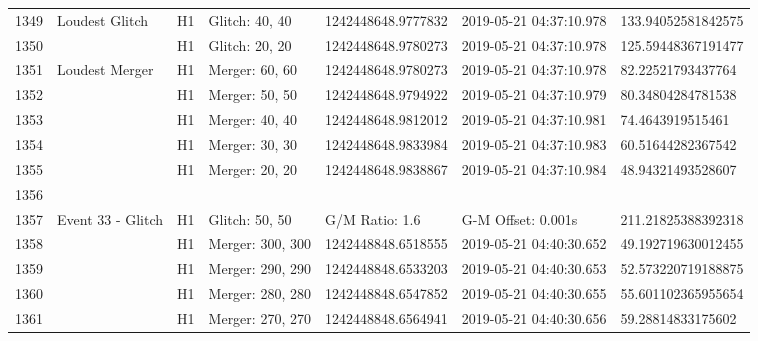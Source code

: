 \begin{longtable}{lllllll}
1349 &                                     Loudest Glitch &       H1 &    Glitch: 40, 40 &  1242448648.9777832 &  2019-05-21 04:37:10.978 &  133.94052581842575 \\
1350 &                                                    &       H1 &    Glitch: 20, 20 &  1242448648.9780273 &  2019-05-21 04:37:10.978 &  125.59448367191477 \\
1351 &                                     Loudest Merger &       H1 &    Merger: 60, 60 &  1242448648.9780273 &  2019-05-21 04:37:10.978 &   82.22521793437764 \\
1352 &                                                    &       H1 &    Merger: 50, 50 &  1242448648.9794922 &  2019-05-21 04:37:10.979 &   80.34804284781538 \\
1353 &                                                    &       H1 &    Merger: 40, 40 &  1242448648.9812012 &  2019-05-21 04:37:10.981 &    74.4643919515461 \\
1354 &                                                    &       H1 &    Merger: 30, 30 &  1242448648.9833984 &  2019-05-21 04:37:10.983 &   60.51644282367542 \\
1355 &                                                    &       H1 &    Merger: 20, 20 &  1242448648.9838867 &  2019-05-21 04:37:10.984 &   48.94321493528607 \\
1356 &                                                    &          &                   &                     &                          &                     \\
1357 &                                  Event 33 - Glitch &       H1 &    Glitch: 50, 50 &      G/M Ratio: 1.6 &       G-M Offset: 0.001s &  211.21825388392318 \\
1358 &                                                    &       H1 &  Merger: 300, 300 &  1242448848.6518555 &  2019-05-21 04:40:30.652 &  49.192719630012455 \\
1359 &                                                    &       H1 &  Merger: 290, 290 &  1242448848.6533203 &  2019-05-21 04:40:30.653 &  52.573220719188875 \\
1360 &                                                    &       H1 &  Merger: 280, 280 &  1242448848.6547852 &  2019-05-21 04:40:30.655 &  55.601102365955654 \\
1361 &                                                    &       H1 &  Merger: 270, 270 &  1242448848.6564941 &  2019-05-21 04:40:30.656 &   59.28814833175602 \\

\end{longtable}
